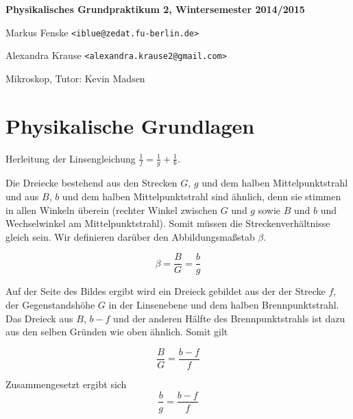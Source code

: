 \documentclass[a4paper,german,12pt,smallheadings]{scrartcl}
\begin{document}
\begin{titlepage}

\end{titlepage}

\allowdisplaybreaks %
\begin{center}
\bfseries %
\sffamily %
\vspace{-40pt}
Physikalisches Grundpraktikum 2, Wintersemester 2014/2015

Markus Fenske \texttt{<iblue@zedat.fu-berlin.de>}

Alexandra Krause \texttt{<alexandra.krause2@gmail.com>}

Mikroskop, Tutor: Kevin Madsen
\vspace{-10pt}
\end{center}

\section{Physikalische Grundlagen}


Herleitung der Linsengleichung $\frac{1}{f} = \frac{1}{g} + \frac{1}{b}$.


Die Dreiecke bestehend aus den Strecken $G$, $g$ und dem halben
Mittelpunktstrahl und aus $B$, $b$ und dem halben Mittelpunktstrahl sind
ähnlich, denn sie stimmen in allen Winkeln überein (rechter Winkel zwischen $G$
und $g$ sowie $B$ und $b$ und Wechselwinkel am Mittelpunktstrahl). Somit müssen
die Streckenverhältnisse gleich sein. Wir definieren darüber den
Abbildungsmaßstab $\beta$.

\begin{equation}
  \beta = \frac{B}{G} = \frac{b}{g}
  \label{eq:beta}
\end{equation}

Auf der Seite des Bildes ergibt wird ein Dreieck gebildet aus der der Strecke
$f$, der Gegenstandshöhe $G$ in der Linsenebene und dem halben
Brennpunktstrahl. Das Dreieck aus $B$, $b-f$ und der anderen Hälfte des
Brennpunktstrahls ist dazu aus den selben Gründen wie oben ähnlich. Somit gilt

\begin{equation}
  \frac{B}{G} = \frac{b-f}{f}
\end{equation}

Zusammengesetzt ergibt sich
\begin{equation}
  \frac{b}{g} = \frac{b-f}{f}
  \label{eq:inter}
\end{equation}
\end{document}
